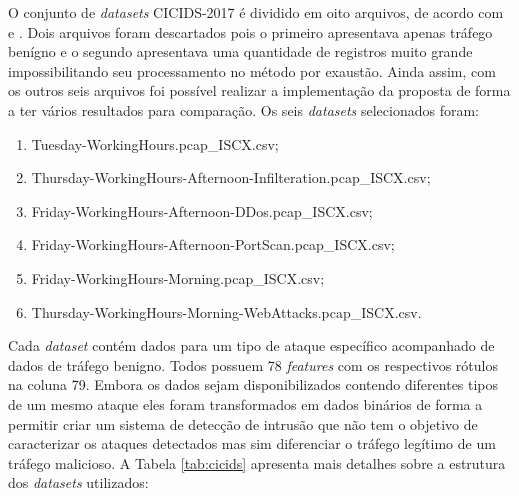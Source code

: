 O conjunto de \textit{datasets} CICIDS-2017 é dividido em oito arquivos, de acordo com  e . Dois arquivos foram descartados pois o primeiro apresentava apenas tráfego benígno e o segundo apresentava uma quantidade de registros muito grande impossibilitando seu processamento no método por exaustão. Ainda assim, com os outros seis arquivos foi possível realizar a implementação da proposta de forma a ter vários resultados para comparação. Os seis \textit{datasets} selecionados foram:

\begin{enumerate}
  \item Tuesday-WorkingHours.pcap\_ISCX.csv;
  \item Thursday-WorkingHours-Afternoon-Infilteration.pcap\_ISCX.csv;
  \item Friday-WorkingHours-Afternoon-DDos.pcap\_ISCX.csv;
  \item Friday-WorkingHours-Afternoon-PortScan.pcap\_ISCX.csv;
  \item Friday-WorkingHours-Morning.pcap\_ISCX.csv;
  \item Thursday-WorkingHours-Morning-WebAttacks.pcap\_ISCX.csv.
  \end{enumerate}

Cada \textit{dataset} contém dados para um tipo de ataque específico acompanhado de dados de tráfego benigno. Todos possuem 78 \textit{features} com os respectivos rótulos na coluna 79. Embora os dados sejam disponibilizados contendo diferentes tipos de um mesmo ataque eles foram transformados em dados binários de forma a permitir criar um sistema de detecção de intrusão que não tem o objetivo de caracterizar os ataques detectados mas sim diferenciar o tráfego legítimo de um tráfego malicioso. A Tabela \ref{tab:cicids} apresenta mais detalhes sobre a estrutura dos \textit{datasets} utilizados:

